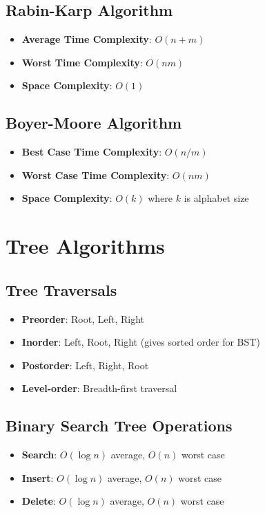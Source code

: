 \documentclass[11pt]{article}
\theoremstyle{definition}
\begin{document}
\subsection{Rabin-Karp Algorithm}
\begin{itemize}
    \item \textbf{Average Time Complexity}: $O(n + m)$
    \item \textbf{Worst Time Complexity}: $O(nm)$
    \item \textbf{Space Complexity}: $O(1)$
\end{itemize}

\subsection{Boyer-Moore Algorithm}
\begin{itemize}
    \item \textbf{Best Case Time Complexity}: $O(n/m)$
    \item \textbf{Worst Case Time Complexity}: $O(nm)$
    \item \textbf{Space Complexity}: $O(k)$ where $k$ is alphabet size
\end{itemize}

\section{Tree Algorithms}

\subsection{Tree Traversals}
\begin{itemize}
    \item \textbf{Preorder}: Root, Left, Right
    \item \textbf{Inorder}: Left, Root, Right (gives sorted order for BST)
    \item \textbf{Postorder}: Left, Right, Root
    \item \textbf{Level-order}: Breadth-first traversal
\end{itemize}

\subsection{Binary Search Tree Operations}
\begin{itemize}
    \item \textbf{Search}: $O(\log n)$ average, $O(n)$ worst case
    \item \textbf{Insert}: $O(\log n)$ average, $O(n)$ worst case
    \item \textbf{Delete}: $O(\log n)$ average, $O(n)$ worst case
\end{itemize}
\end{document}
